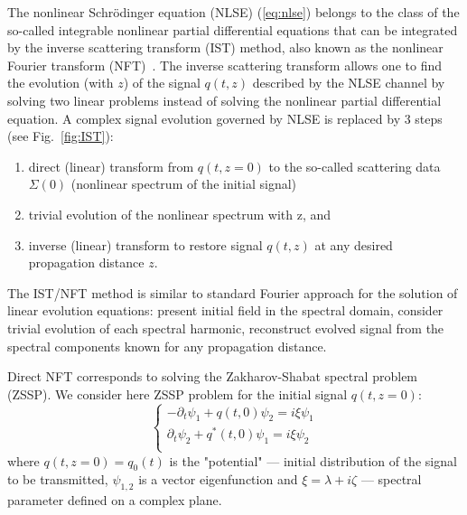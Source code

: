 The nonlinear Schr\"odinger equation (NLSE) (\ref{eq:nlse}) belongs to the class of the so-called integrable nonlinear partial differential equations that can be integrated by the inverse scattering transform (IST) method, also known as the nonlinear Fourier transform (NFT)~\cite{ZakharovShabat1972, Ablowitz1981}.
The inverse scattering transform allows one to find the evolution (with $z$) of the signal $q(t,z)$ described by the NLSE channel by solving two linear problems instead of solving the nonlinear partial differential equation. A complex signal evolution governed by NLSE is replaced by 3 steps (see Fig.~\ref{fig:IST}):
\begin{enumerate}
    \item direct (linear) transform from $q(t,z=0)$ to the so-called scattering data $\Sigma(0)$ (nonlinear spectrum of the initial signal)
    \item trivial evolution of the nonlinear spectrum with z, and
    \item inverse (linear) transform to restore signal $q(t,z)$ at any desired propagation distance $z$.
\end{enumerate}
The IST/NFT method is similar to standard Fourier approach for the solution of linear evolution equations: present initial field in the spectral domain, consider trivial evolution of each spectral harmonic, reconstruct evolved signal from the spectral components known for any propagation distance.


Direct NFT corresponds to solving the Zakharov-Shabat spectral problem (ZSSP). We consider here ZSSP problem for the initial signal $q(t,z=0)$: 
\begin{equation}
\left\{
\begin{aligned}
	- \partial_{t} \psi_1 + q(t,0) \psi_2 = i \xi \psi_1 \\
	\partial_{t} \psi_2 + q^{*}(t,0) \psi_1 = i \xi \psi_2 \\
\end{aligned}
\right.
\label{eq:ZS}
\end{equation}
where $q(t,z=0)=q_{0}(t)$ is the "potential" --- initial distribution of the signal to be transmitted, $\psi_{1,2}$ is a vector eigenfunction and $\xi = \lambda + i \zeta$ --- spectral parameter defined on a complex plane.

